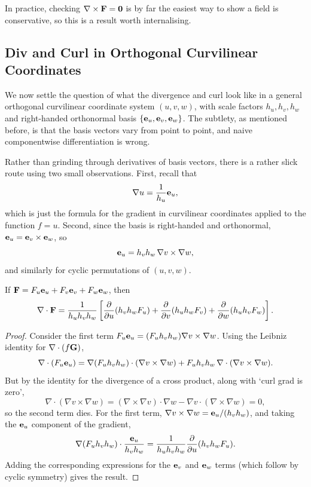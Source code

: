 \documentclass[a4paper]{scrartcl}
\begin{document}
In practice, checking $\nabla \times \mathbf{F} = \mathbf{0}$ is by far the easiest way to show a field is conservative, so this is a result worth internalising.

\subsection{Div and Curl in Orthogonal Curvilinear Coordinates}

We now settle the question of what the divergence and curl look like in a general orthogonal curvilinear coordinate system $(u, v, w)$, with scale factors $h_u, h_v, h_w$ and right-handed orthonormal basis $\{\mathbf{e}_u, \mathbf{e}_v, \mathbf{e}_w\}$. The subtlety, as mentioned before, is that the basis vectors vary from point to point, and naive componentwise differentiation is wrong.

Rather than grinding through derivatives of basis vectors, there is a rather slick route using two small observations. First, recall that
$$
\nabla u = \frac{1}{h_u} \mathbf{e}_u,
$$
which is just the formula for the gradient in curvilinear coordinates applied to the function $f = u$. Second, since the basis is right-handed and orthonormal, $\mathbf{e}_u = \mathbf{e}_v \times \mathbf{e}_w$, so
$$
\mathbf{e}_u = h_v h_w \, \nabla v \times \nabla w,
$$
and similarly for cyclic permutations of $(u, v, w)$.

\begin{proposition}
	If $\mathbf{F} = F_u \mathbf{e}_u + F_v \mathbf{e}_v + F_w \mathbf{e}_w$, then
	$$
	\nabla \cdot \mathbf{F} = \frac{1}{h_u h_v h_w}\left[\frac{\partial}{\partial u}(h_v h_w F_u) + \frac{\partial}{\partial v}(h_u h_w F_v) + \frac{\partial}{\partial w}(h_u h_v F_w)\right].
	$$
\end{proposition}
\begin{proof}
	Consider the first term $F_u \mathbf{e}_u = (F_u h_v h_w) \nabla v \times \nabla w$. Using the Leibniz identity for $\nabla \cdot (f \mathbf{G})$,
	$$
	\nabla \cdot (F_u \mathbf{e}_u) = \nabla(F_u h_v h_w) \cdot (\nabla v \times \nabla w) + F_u h_v h_w \, \nabla \cdot (\nabla v \times \nabla w).
	$$
	But by the identity for the divergence of a cross product, along with `curl grad is zero',
	$$
	\nabla \cdot (\nabla v \times \nabla w) = (\nabla \times \nabla v) \cdot \nabla w - \nabla v \cdot (\nabla \times \nabla w) = 0,
	$$
	so the second term dies. For the first term, $\nabla v \times \nabla w = \mathbf{e}_u / (h_v h_w)$, and taking the $\mathbf{e}_u$ component of the gradient,
	$$
	\nabla(F_u h_v h_w) \cdot \frac{\mathbf{e}_u}{h_v h_w} = \frac{1}{h_u h_v h_w} \frac{\partial}{\partial u}(h_v h_w F_u).
	$$
	Adding the corresponding expressions for the $\mathbf{e}_v$ and $\mathbf{e}_w$ terms (which follow by cyclic symmetry) gives the result.
\end{proof}
\end{document}

